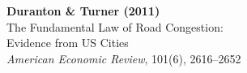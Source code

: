 \documentclass[12pt]{article}
\begin{document}
\begin{center}
{\Large\bfseries Duranton \& Turner (2011)}\\
{\large The Fundamental Law of Road Congestion:}\\
{\large Evidence from US Cities}\\
\vspace{0.5em}
{\normalsize \textit{American Economic Review}, 101(6), 2616--2652}
\end{center}

\vspace{1em}




\end{document}
